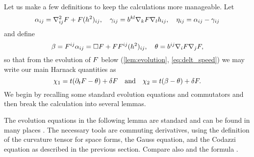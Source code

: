 \documentclass{amsart}
\begin{document}
Let us make a few definitions to keep the calculations more manageable. Let
\[
\alpha_{ij} = \nabla^2_{ij} F + F(h^2)_{ij}, \quad \gamma_{ij} = b^{kl} \nabla_k F \nabla_l h_{ij}, \quad \eta_{ij} = \alpha_{ij} - \gamma_{ij}
\]
and define
\[
\beta = F^{ij} \alpha_{ij} = \Box F + F F^{ij}(h^2)_{ij}, \quad \theta =  b^{ij} \nabla_i F \nabla_j F,
\]
so that from the evolution of \(F\) below (\cref{lem:evolution}, \cref{eq:delt_speed}) we may write our main Harnack quantities as
\[
\chi_1 = t(\partial_tF- \theta) + \delta F
\quad \mbox{and}\quad
\chi_2 = t(\beta - \theta) + \delta F.
\]
We begin by recalling some standard evolution equations and commutators and then break the calculation into several lemmas.

The evolution equations in the following lemma are standard and can be found in many places \cite{Andrews:09/1994, Chow:06/1991, Hamilton:/1995, Huisken:/1987a, Smoczyk:/1997}. The necessary tools are commuting derivatives, using the definition of the curvature tensor for space forms, the Gauss equation, and the Codazzi equation as described in the previous section. Compare also \cite[p.~94-95]{Gerhardt:/2006} and the formula \cite[eq.~(6.17)]{Gerhardt:01/1996}.
\end{document}
